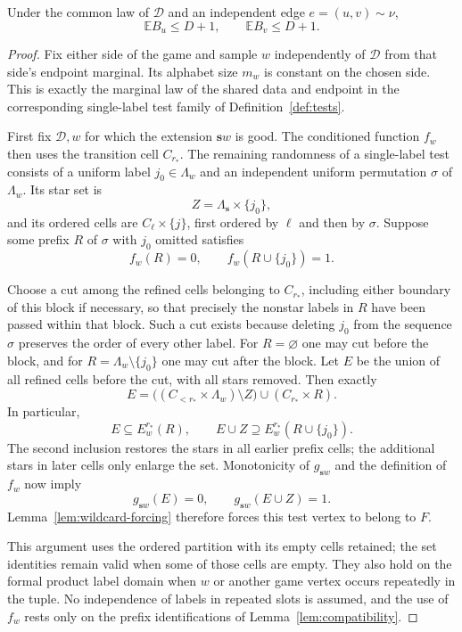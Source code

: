 \begin{proposition}
\label{prop:pivotal-budget}
Under the common law of $\mathcal D$ and an independent edge
$e=(u,v)\sim\nu$,
\begin{equation}
 \mathbb E B_u\le D+1,
 \qquad
 \mathbb E B_v\le D+1.
 \label{eq:pivotal-budget}
\end{equation}
\end{proposition}

\begin{proof}
Fix either side of the game and sample $w$ independently of
$\mathcal D$ from that side's endpoint marginal.  Its alphabet size
$m_w$ is constant on the chosen side.  This is exactly the marginal law
of the shared data and endpoint in the corresponding single-label test
family of Definition~\ref{def:tests}.

First fix $\mathcal D,w$ for which the extension $\mathbf s w$ is good.
The conditioned function $f_w$ then uses the transition cell $C_{r_*}$.
The remaining randomness of a single-label test consists of a uniform
label $j_0\in\Lambda_w$ and an independent uniform permutation $\sigma$
of $\Lambda_w$.  Its star set is
\[
 Z=\Lambda_{\mathbf s}\times\{j_0\},
\]
and its ordered cells are $C_\ell\times\{j\}$, first ordered by
$\ell$ and then by $\sigma$.  Suppose some prefix $R$ of $\sigma$ with
$j_0$ omitted satisfies
\[
 f_w(R)=0,
 \qquad f_w(R\cup\{j_0\})=1.
\]

Choose a cut among the refined cells belonging to $C_{r_*}$, including
either boundary of this block if necessary, so that precisely the
nonstar labels in $R$ have been passed within that block.  Such a cut
exists because deleting $j_0$ from the sequence $\sigma$ preserves the
order of every other label.  For $R=\varnothing$ one may cut before the
block, and for $R=\Lambda_w\setminus\{j_0\}$ one may cut after the
block.  Let $E$ be the union of all refined cells before the cut, with
all stars removed.  Then exactly
\[
 E=\bigl((C_{<r_*}\times\Lambda_w)\setminus Z\bigr)
       \cup(C_{r_*}\times R).
\]
In particular,
\[
 E\subseteq E_w^{r_*}(R),
 \qquad
 E\cup Z\supseteq E_w^{r_*}(R\cup\{j_0\}).
\]
The second inclusion restores the stars in all earlier prefix cells;
the additional stars in later cells only enlarge the set.  Monotonicity
of $g_{\mathbf s w}$ and the definition of $f_w$ now imply
\[
 g_{\mathbf s w}(E)=0,
 \qquad g_{\mathbf s w}(E\cup Z)=1.
\]
Lemma~\ref{lem:wildcard-forcing} therefore forces this test vertex to
belong to $F$.

This argument uses the ordered partition with its empty cells retained;
the set identities remain valid when some of those cells are empty.
They also hold on the formal product label domain when $w$ or another
game vertex occurs repeatedly in the tuple.  No independence of labels
in repeated slots is assumed, and the use of $f_w$ rests only on the
prefix identifications of Lemma~\ref{lem:compatibility}.


\end{proof}
